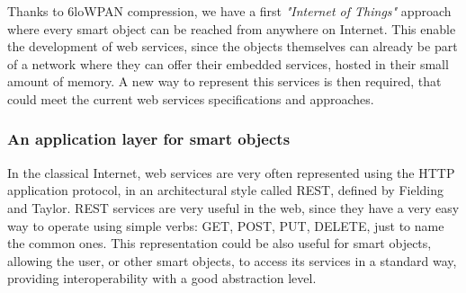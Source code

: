 
Thanks to 6loWPAN compression, we have a first \textit{"Internet of Things"} approach where every smart object can be reached from anywhere on Internet.
This enable the development of web services, since the objects themselves can already be part of a network where they can offer their embedded services, hosted in their small amount of memory.
A new way to represent this services is then required, that could meet the current web services specifications and approaches.

\subsubsection{An application layer for smart objects}
In the classical Internet, web services are very often represented using the HTTP application protocol\cite{rfc2616}, in an architectural style called REST, defined by Fielding and Taylor\cite{Fielding02REST}.
REST services are very useful in the web, since they have a very easy way to operate using simple verbs: GET, POST, PUT, DELETE, just to name the common ones.
This representation could be also useful for smart objects, allowing the user, or other smart objects, to access its services in a standard way, providing interoperability with a good abstraction level.

